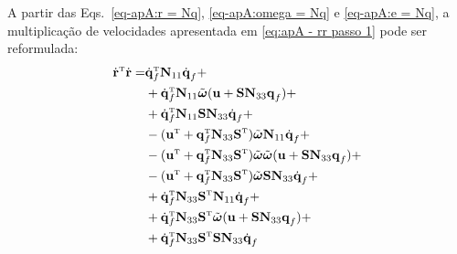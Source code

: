 A partir das Eqs.~\eqref{eq-apA:r = Nq}, \eqref{eq-apA:omega = Nq} e
\eqref{eq-apA:e = Nq}, a multiplicação de velocidades apresentada em
\eqref{eq:apA - rr passo 1} pode ser reformulada:
\begin{align}
 \tp{\dot{\vec{r}}}\dot{\vec{r}} =&
\tp{\dot{\vec{q}}}_f \vec{N}_{11} \dot{\vec{q}}_f + \\&
+\tp{\dot{\vec{q}}}_f \vec{N}_{11} \tilde{\vec{\omega}} (\vec{u} +
\vec{S}\vec{N}_{33}\vec{q}_f) + \\&
+\tp{\dot{\vec{q}}}_f \vec{N}_{11}\vec{S}\vec{N}_{33}\dot{\vec{q}}_f + \\&
-(\tp{\vec{u}} + \tp{\vec{q}}_f\vec{N}_{33}\tp{\vec{S}})
\tilde{\vec{\omega}} \vec{N}_{11} \dot{\vec{q}}_f + \\&
-(\tp{\vec{u}} + \tp{\vec{q}}_f\vec{N}_{33}\tp{\vec{S}})
\tilde{\vec{\omega}}\tilde{\vec{\omega}}(\vec{u} +
\vec{S}\vec{N}_{33}\vec{q}_f) +\\&
-(\tp{\vec{u}} + \tp{\vec{q}}_f\vec{N}_{33}\tp{\vec{S}})
\tilde{\vec{\omega}}\vec{S}\vec{N}_{33}\dot{\vec{q}}_f + \\&
+
\tp{\dot{\vec{q}}}_f\vec{N}_{33}\tp{\vec{S}}\vec{N}_{11}\dot{\vec{q}}_f
+ \\&
+
\tp{\dot{\vec{q}}}_f\vec{N}_{33}\tp{\vec{S}}\tilde{\vec{\omega}}(\vec{u
} + \vec{S}\vec{N}_{33}\vec{q}_f) + \\&
+\tp{\dot{\vec{q}}}_f\vec{N}_{33}\tp{\vec{S}}\vec{S}\vec{N}_{33}\dot{
\vec{q}}_f
\end{align}

